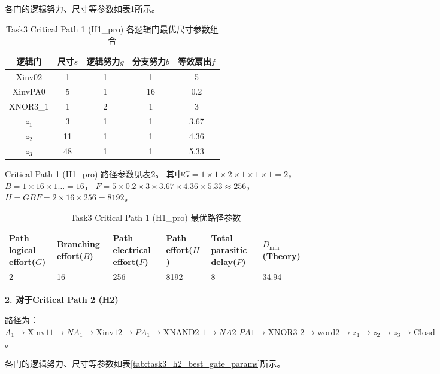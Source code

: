 \documentclass[UTF8,12pt,a4paper]{ctexart}
\begin{document}
各门的逻辑努力、尺寸等参数如表\ref{tab:task3_h1_best_gate_params}所示。

\begin{table}[htbp]
\centering
\caption{Task3 Critical Path 1 (H1\_pro) 各逻辑门最优尺寸参数组合}
\label{tab:task3_h1_best_gate_params}
\begin{tabular}{ccccc}
\toprule
逻辑门 & 尺寸$s$ & 逻辑努力$g$ & 分支努力$b$ & 等效扇出$f$ \\
\midrule
Xinv02    & 1 & 1 & 1 & 5 \\
XinvPA0   & 5 & 1 & 16 & 0.2 \\
XNOR3\_1  & 1 & 2 & 1 & 3 \\
$z_1$     & 3 & 1 & 1 & 3.67 \\
$z_2$     & 11 & 1 & 1 & 4.36 \\
$z_3$     & 48 & 1 & 1 & 5.33 \\
\bottomrule
\end{tabular}
\end{table}

Critical Path 1 (H1\_pro) 路径参数见表\ref{tab:task3_h1_best_path_params}。
其中$G = 1 \times 1 \times 2 \times 1 \times 1 \times 1 = 2$，$B = 1 \times 16 \times 1 \dots = 16$，
$F = 5 \times 0.2 \times 3 \times 3.67 \times 4.36 \times 5.33 \approx 256$，
$H = GBF = 2 \times 16 \times 256 = 8192$。

\begin{table}[htbp]
    \centering
    \caption{Task3 Critical Path 1 (H1\_pro) 最优路径参数}
    \label{tab:task3_h1_best_path_params}
    \begin{tabularx}{\linewidth}{XXXXXX}
    \toprule
    Path logical effort($G$) & Branching effort($B$) &
    Path electrical effort($F$) & Path effort($H$) &
    Total parasitic delay($P$) & $D_{\text{min}}$(Theory) \\
    \midrule
    2 & 16 & 256 & 8192 & 8 & 34.94 \\
    \bottomrule
    \end{tabularx}
\end{table}

\textbf{2. 对于Critical Path 2 (H2)}

路径为：$A_1 \rightarrow \text{Xinv11} \rightarrow NA_1 \rightarrow \text{Xinv12} \rightarrow PA_1 \rightarrow \text{XNAND2\_1} \rightarrow NA2\_PA1 \rightarrow \text{XNOR3\_2} \rightarrow \text{word2} \rightarrow z_1 \rightarrow z_2 \rightarrow z_3 \rightarrow \text{Cload}$。

各门的逻辑努力、尺寸等参数如表\ref{tab:task3_h2_best_gate_params}所示。
\end{document}
